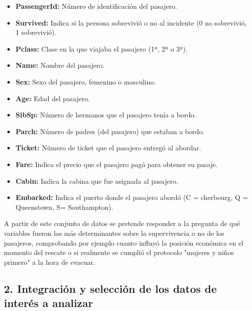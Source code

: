 \documentclass[12pt]{article}
\providecommand{\tightlist}{%
  \setlength{\itemsep}{0pt}\setlength{\parskip}{0pt}}
\begin{document}
\begin{itemize}
\tightlist
\item
  \textbf{PassengerId:} Número de identificación del pasajero.\\  
\item
  \textbf{Survived:} Indica si la persona sobrevivió o no al incidente (0 no sobrevivió, 1 sobrevivió).\\
\item
  \textbf{Pclass:} Clase en la que viajaba el pasajero (1ª, 2ª o 3ª).\\ 
\item
  \textbf{Name:} Nombre del pasajero.\\ 
\item
  \textbf{Sex:} Sexo del pasajero, femenino o masculino.\\
\item
  \textbf{Age:} Edad del pasajero.\\
\item
  \textbf{SibSp:} Número de hermanos que el pasajero tenía a bordo.\\
\item
  \textbf{Parch:} Número de padres (del pasajero) que estaban a bordo.\\
\item
  \textbf{Ticket:} Número de ticket que el pasajero entregó al abordar.\\
\item
  \textbf{Fare:} Indica el precio que el pasajero pagó para obtener su pasaje.\\
\item
  \textbf{Cabin:} Indica la cabina que fue asignada al pasajero.\\
\item
  \textbf{Embarked:} Indica el puerto donde el pasajero abordó (C = cherbourg, Q = Queenstown, S= Southampton).\\
\end{itemize}

A partir de este conjunto de datos se pretende responder a la pregunta de qué variables fueron las más determinantes sobre la supervivencia o no de los pasajeros, comprobando por ejemplo cuanto influyó la posición económica en el momento del rescate o si realmente se cumplió el protocolo "mujeres y niños primero" a la hora de evacuar.

	
\hypertarget{seleccion}{%
\subsection{2. Integración y selección de los datos de interés a analizar}\label{seleccion}}
\end{document}
